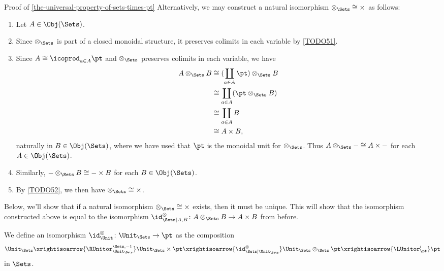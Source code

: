 \begin{Proof}{Proof of \cref{the-universal-property-of-sets-times-pt}}
    Alternatively, we may construct a natural isomorphism $\mathord{\otimes_{\Sets}}\cong\mathord{\times}$ as follows:
    \begin{enumerate}
        \item\label{proof-of-the-universal-property-of-sets-times-pt-constructing-an-isomorphism-otimes-times-1}Let $A\in\Obj(\Sets)$.
        \item\label{proof-of-the-universal-property-of-sets-times-pt-constructing-an-isomorphism-otimes-times-2}Since $\otimes_{\Sets}$ is part of a closed monoidal structure, it preserves colimits in each variable by \cref{TODO51}.
        \item\label{proof-of-the-universal-property-of-sets-times-pt-constructing-an-isomorphism-otimes-times-3}Since $A\cong\icoprod_{a\in A}\pt$ and $\otimes_{\Sets}$ preserves colimits in each variable, we have
            \begin{align*}
                A\otimes_{\Sets}B &\cong (\coprod_{a\in A}\pt)\otimes_{\Sets}B\\
                                  &\cong \coprod_{a\in A}(\pt\otimes_{\Sets}B)\\
                                  &\cong \coprod_{a\in A}B\\
                                  &\cong A\times B,
            \end{align*}
            naturally in $B\in\Obj(\Sets)$, where we have used that $\pt$ is the monoidal unit for $\otimes_{\Sets}$. Thus $A\otimes_{\Sets}-\cong A\times-$ for each $A\in\Obj(\Sets)$.
        \item\label{proof-of-the-universal-property-of-sets-times-pt-constructing-an-isomorphism-otimes-times-4}Similarly, $-\otimes_{\Sets}B\cong-\times B$ for each $B\in\Obj(\Sets)$.
        \item\label{proof-of-the-universal-property-of-sets-times-pt-constructing-an-isomorphism-otimes-times-5}By \cref{TODO52}, we then have $\mathord{\otimes_{\Sets}}\cong\mathord{\times}$.
    \end{enumerate}
    Below, we'll show that if a natural isomorphism $\mathord{\otimes_{\Sets}}\cong\mathord{\times}$ exists, then it must be unique. This will show that the isomorphism constructed above is equal to the isomorphism $\id^{\otimes}_{\Sets|A,B}\colon A\otimes_{\Sets}B\to A\times B$ from before.

    We define an isomorphism $\id^{\otimes}_{\Unit}\colon\Unit_{\Sets}\to\pt$ as the composition
    \[
        \Unit_{\Sets}%
        \xrightisoarrow{\RUnitor^{\Sets,-1}_{\Unit_{\Sets}}}%
        \Unit_{\Sets}\times\pt%
        \xrightisoarrow{\id^{\otimes}_{\Sets|\Unit_{\Sets}}}%
        \Unit_{\Sets}\otimes_{\Sets}\pt%
        \xrightisoarrow{\LUnitor'_{\pt}}%
        \pt%
    \]%
    in $\Sets$.


\end{Proof}
